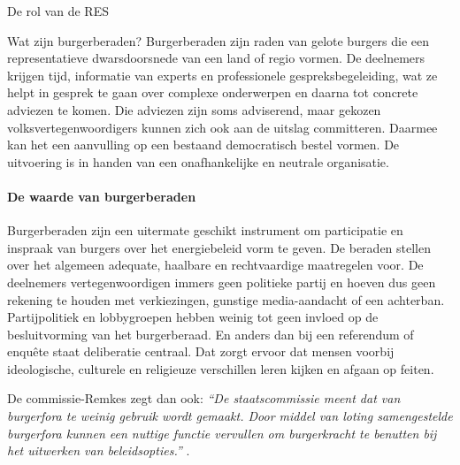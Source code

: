 \begin{voorstel}{De rol van de RES}
\begin{multicols*}{2}
\begin{overwegingen}

\begin{infobox}{Wat zijn burgerberaden?}
Burgerberaden zijn raden van gelote burgers die een representatieve dwarsdoorsnede van een land of regio vormen.
De deelnemers krijgen tijd, informatie van experts en professionele gespreksbegeleiding, wat ze helpt in gesprek te gaan over complexe onderwerpen en daarna tot concrete adviezen te komen. Die adviezen zijn soms adviserend, maar gekozen volksvertegenwoordigers kunnen zich ook aan de uitslag committeren.
Daarmee kan het een aanvulling op een bestaand democratisch bestel vormen.
De uitvoering is in handen van een onafhankelijke en neutrale organisatie.
\end{infobox}

\paragraph{De waarde van burgerberaden}
Burgerberaden zijn een uitermate geschikt instrument om participatie en inspraak van burgers over het energiebeleid vorm te geven.
De beraden stellen over het algemeen adequate, haalbare en rechtvaardige maatregelen voor. De deelnemers vertegenwoordigen immers geen politieke partij en hoeven dus geen rekening te houden met verkiezingen, gunstige media-aandacht of een achterban. Partijpolitiek en lobbygroepen hebben weinig tot geen invloed op de besluitvorming van het burgerberaad. En anders dan bij een referendum of enquête staat deliberatie centraal. Dat zorgt ervoor dat mensen voorbij ideologische, culturele en religieuze verschillen leren kijken en afgaan op feiten.

De commissie-Remkes zegt dan ook:
\textit{``De staatscommissie meent dat van burgerfora te weinig gebruik wordt gemaakt. Door middel van loting samengestelde burgerfora kunnen een nuttige functie vervullen om burgerkracht te benutten bij het uitwerken van beleidsopties.''} \parencite[p.\ 156]{staatscommissie_parlementair_stelsel_lage_2018}.


\end{overwegingen}
\end{multicols*}
\end{voorstel}
